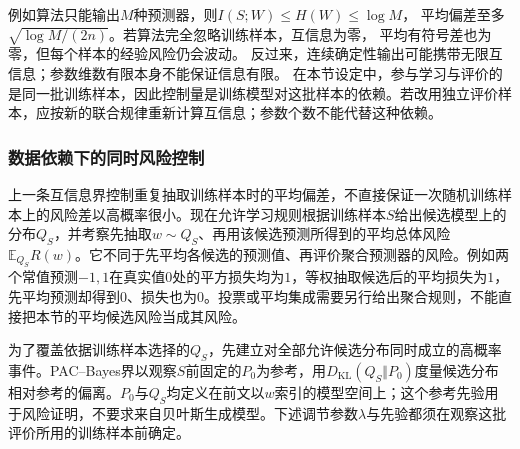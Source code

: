 例如算法只能输出\(M\)种预测器，则\(I(S;W)\leq H(W)\leq\log M\)，
平均偏差至多\(\sqrt{\log M/(2n)}\)。若算法完全忽略训练样本，互信息为零，
平均有符号差也为零，但每个样本的经验风险仍会波动。
反过来，连续确定性输出可能携带无限互信息；参数维数有限本身不能保证信息有限。
在本节设定中，参与学习与评价的是同一批训练样本，因此控制量是训练模型对这批样本的依赖。若改用独立评价样本，应按新的联合规律重新计算互信息；参数个数不能代替这种依赖。

\subsubsection{数据依赖下的同时风险控制}
\label{sec:information-pac-bayes}

上一条互信息界控制重复抽取训练样本时的平均偏差，不直接保证一次随机训练样本上的风险差以高概率很小。现在允许学习规则根据训练样本\(S\)给出候选模型上的分布\(Q_S\)，并考察先抽取\(w\sim Q_S\)、再用该候选预测所得到的平均总体风险\(\mathbb E_{Q_S}R(w)\)。它不同于先平均各候选的预测值、再评价聚合预测器的风险。例如两个常值预测\(-1,1\)在真实值\(0\)处的平方损失均为\(1\)，等权抽取候选后的平均损失为\(1\)，先平均预测却得到\(0\)、损失也为\(0\)。投票或平均集成需要另行给出聚合规则，不能直接把本节的平均候选风险当成其风险。

为了覆盖依据训练样本选择的\(Q_S\)，先建立对全部允许候选分布同时成立的高概率事件。PAC--Bayes界以观察\(S\)前固定的\(P_0\)为参考，用\(D_{\mathrm{KL}}(Q_S\Vert P_0)\)度量候选分布相对参考的偏离。\(P_0\)与\(Q_S\)均定义在前文以\(w\)索引的模型空间上；这个参考先验用于风险证明，不要求来自贝叶斯生成模型。下述调节参数\(\lambda\)与先验都须在观察这批评价所用的训练样本前确定。

